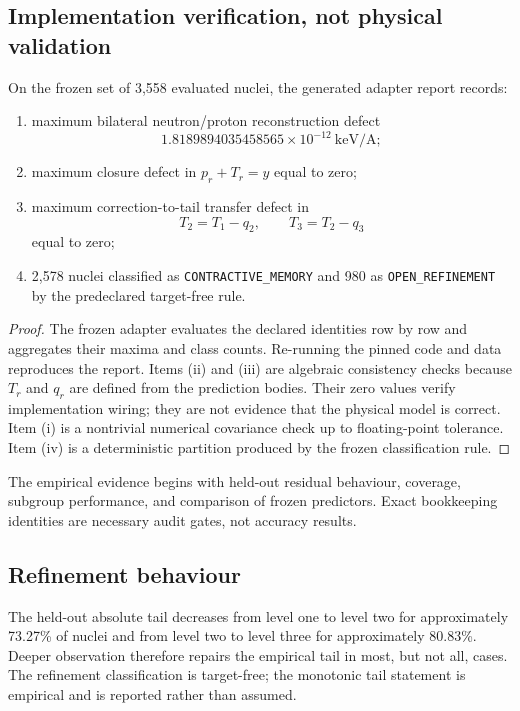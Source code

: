 \subsection{Implementation verification, not physical validation}

\begin{proposition}\label{thm:t45wiring}
On the frozen set of 3,558 evaluated nuclei, the generated adapter report records:
\begin{enumerate}[label=(\roman*)]
\item maximum bilateral neutron/proton reconstruction defect
\[
 1.8189894035458565\times10^{-12}\ \mathrm{keV/A};
\]
\item maximum closure defect in $p_r+T_r=y$ equal to zero;
\item maximum correction-to-tail transfer defect in
\[
 T_2=T_1-q_2,
 \qquad
 T_3=T_2-q_3
\]
equal to zero;
\item 2,578 nuclei classified as \texttt{CONTRACTIVE\_MEMORY} and 980 as \texttt{OPEN\_REFINEMENT} by the predeclared target-free rule.
\end{enumerate}
\end{proposition}

\begin{proof}
The frozen adapter evaluates the declared identities row by row and aggregates their maxima and class counts. Re-running the pinned code and data reproduces the report. Items (ii) and (iii) are algebraic consistency checks because $T_r$ and $q_r$ are defined from the prediction bodies. Their zero values verify implementation wiring; they are not evidence that the physical model is correct. Item (i) is a nontrivial numerical covariance check up to floating-point tolerance. Item (iv) is a deterministic partition produced by the frozen classification rule.
\end{proof}

\begin{remark}
The empirical evidence begins with held-out residual behaviour, coverage, subgroup performance, and comparison of frozen predictors. Exact bookkeeping identities are necessary audit gates, not accuracy results.
\end{remark}

\subsection{Refinement behaviour}

The held-out absolute tail decreases from level one to level two for approximately 73.27\% of nuclei and from level two to level three for approximately 80.83\%. Deeper observation therefore repairs the empirical tail in most, but not all, cases. The refinement classification is target-free; the monotonic tail statement is empirical and is reported rather than assumed.


